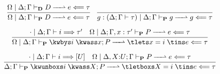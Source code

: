 %
\[
  \begin{array}{c}
  \infer{%
    \prftransjudg{\Omega \mid \goalctx{}}{D}{e}{\tau}
  }{%
    \dirtransjudg{\Omega \mid \goalctx{}}{D}{e}{\tau}
  }
  \quad
  \infer{%
    \prftransjudg{g : \goal{} \mid \goalctx{}}{g}{g}{\tau}
  }{}
    \\[1em]
  \infer{%
    \prftransjudg{\Omega \mid \goalctx{}}{\kwbys i\;\kwass x; P}{\tlets x = i\;\tins e}{\tau}
  }{%
    \belsynjudg{\cdot \mid \goalctx{}}{i}{\tau^\prime}
    &
    \prftransjudg{\Omega \mid \Delta; \Gamma, x : \tau^\prime}{P}{e}{\tau}
  }
      \\[1em]
  \infer{%
    \prftransjudg{\goalctx{}}{\kwunboxs i\;\kwass X; P}{%
      \tletboxs X = i\;\tins e
    }{\tau}
  }{%
    \belsynjudg{\cdot \mid\goalctx{}}{i}{[U]}
    &
    \prftransjudg{\Omega \mid \Delta, X{:}U; \Gamma}{P}{e}{\tau}
  }
  \end{array}
\]

~


